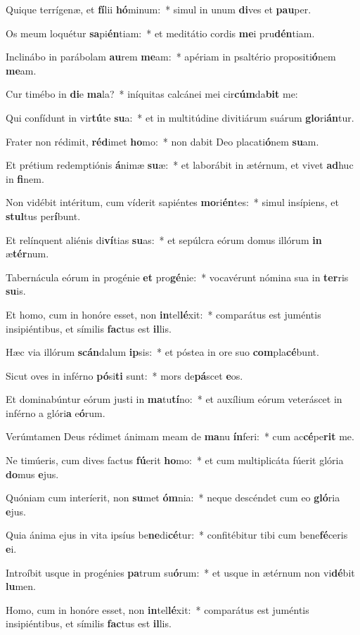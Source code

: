 \item Quique terrígenæ, et \textbf{fí}lii \textbf{hó}minum:~* simul in unum \textbf{di}ves et \textbf{pau}per.
\item Os meum loquétur \textbf{sa}pi\textbf{én}tiam:~* et meditátio cordis \textbf{me}i pru\textbf{dén}tiam.
\item Inclinábo in parábolam \textbf{au}rem \textbf{me}am:~* apériam in psaltério propositi\textbf{ó}nem \textbf{me}am.
\item Cur timébo in \textbf{di}e \textbf{ma}la?~* iníquitas calcánei mei cir\textbf{cúm}da\textbf{bit} me:
\item Qui confídunt in vir\textbf{tú}te \textbf{su}a:~* et in multitúdine divitiárum suárum \textbf{glo}ri\textbf{án}tur.
\item Frater non rédimit, \textbf{réd}imet \textbf{ho}mo:~* non dabit Deo placati\textbf{ó}nem \textbf{su}am.
\item Et prétium redemptiónis \textbf{á}nimæ \textbf{su}æ:~* et laborábit in ætérnum, et vivet \textbf{ad}huc in \textbf{fi}nem.
\item Non vidébit intéritum, cum víderit sapiéntes \textbf{mo}ri\textbf{én}tes:~* simul insípiens, et \textbf{stul}tus per\textbf{í}bunt.
\item Et relínquent aliénis di\textbf{ví}tias \textbf{su}as:~* et sepúlcra eórum domus illórum \textbf{in} æ\textbf{tér}num.
\item Tabernácula eórum in progénie \textbf{et} pro\textbf{gé}nie:~* vocavérunt nómina sua in \textbf{ter}ris \textbf{su}is.
\item Et homo, cum in honóre esset, non \textbf{in}tel\textbf{lé}xit:~* comparátus est juméntis insipiéntibus, et símilis \textbf{fac}tus est \textbf{il}lis.
\item Hæc via illórum \textbf{scán}dalum \textbf{ip}sis:~* et póstea in ore suo \textbf{com}pla\textbf{cé}bunt.
\item Sicut oves in inférno \textbf{pó}si\textbf{ti} sunt:~* mors de\textbf{pá}scet \textbf{e}os.
\item Et dominabúntur eórum justi in \textbf{ma}tu\textbf{tí}no:~* et auxílium eórum veteráscet in inférno a glóri\textbf{a} e\textbf{ó}rum.
\item Verúmtamen Deus rédimet ánimam meam de \textbf{ma}nu \textbf{ín}feri:~* cum ac\textbf{cé}pe\textbf{rit} me.
\item Ne timúeris, cum dives factus \textbf{fú}erit \textbf{ho}mo:~* et cum multiplicáta fúerit glória \textbf{do}mus \textbf{e}jus.
\item Quóniam cum interíerit, non \textbf{su}met \textbf{óm}nia:~* neque descéndet cum eo \textbf{gló}ria \textbf{e}jus.
\item Quia ánima ejus in vita ipsíus be\textbf{ne}di\textbf{cé}tur:~* confitébitur tibi cum bene\textbf{fé}ceris \textbf{e}i.
\item Introíbit usque in progénies \textbf{pa}trum su\textbf{ó}rum:~* et usque in ætérnum non vi\textbf{dé}bit \textbf{lu}men.
\item Homo, cum in honóre esset, non \textbf{in}tel\textbf{lé}xit:~* comparátus est juméntis insipiéntibus, et símilis \textbf{fac}tus est \textbf{il}lis.
